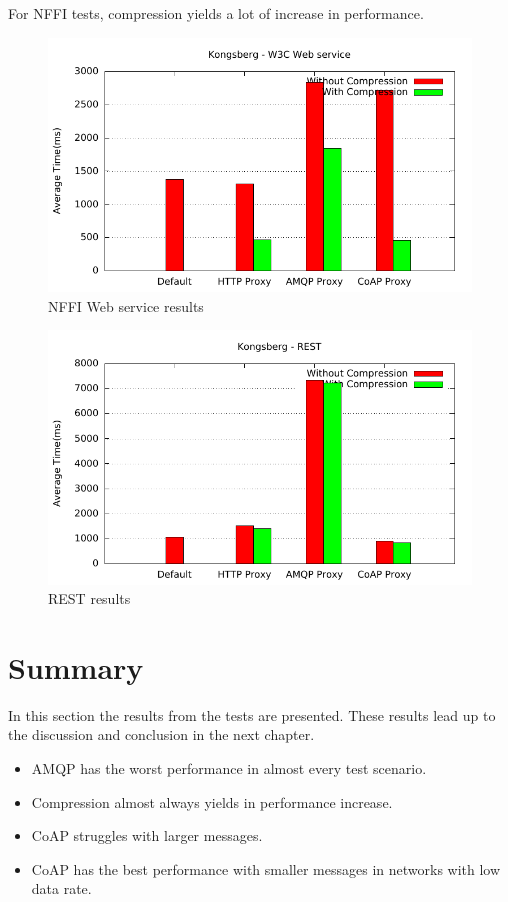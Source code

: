 For NFFI tests, compression yields a lot of increase in performance.

\begin{figure}[H]
\center
\includegraphics[scale=0.75]{../results/kongsberg/nffi/out.pdf}
\caption{NFFI Web service results}
\end{figure}

\begin{figure}[H]
\center
\includegraphics[scale=0.75]{../results/kongsberg/rest/out.pdf}
\caption{REST results}
\end{figure}



\section{Summary}

In this section the results from the tests are presented. These results lead up
to the discussion and conclusion in the next chapter.

\begin{itemize}
\item AMQP has the worst performance in almost every test scenario.
\item Compression almost always yields in performance increase.
\item CoAP struggles with larger messages.
\item CoAP has the best performance with smaller messages in networks with low data rate.
\end{itemize}
